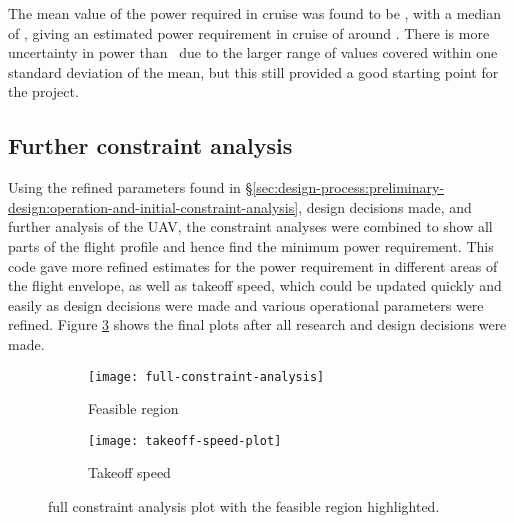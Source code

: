 \documentclass[../../main.tex]{subfiles}
\begin{document}
The mean value of the power required in cruise was found to be , with a median of , giving an estimated power requirement in cruise of around .
There is more uncertainty in power than \vcruise\, due to the larger range of values covered within one standard deviation of the mean, but this still provided a good starting point for the project.

\subsection{Further constraint analysis} \label{sec:design-process:preliminary-design:further-constraint-analysis}

Using the refined parameters found in \S \ref{sec:design-process:preliminary-design:operation-and-initial-constraint-analysis}, design decisions made, and further analysis of the UAV, the constraint analyses were combined to show all parts of the flight profile and hence find the minimum power requirement.
This code gave more refined estimates for the power requirement in different areas of the flight envelope, as well as takeoff speed, which could be updated quickly and easily as design decisions were made and various operational parameters were refined.
Figure \ref{fig:constraint-analysis} shows the final plots after all research and design decisions were made.


\begin{figure}[H]
    \centering
    \begin{subfigure}[b]{0.85\columnwidth}
        \centering
        \texttt{[image: full-constraint-analysis]}
        \caption{Feasible region}
        \label{fig:constraint-analysis:full}
    \end{subfigure}
    \hfill
    \begin{subfigure}[b]{0.85\columnwidth}
        \centering
        \texttt{[image: takeoff-speed-plot]}
        \caption{Takeoff speed}
        \label{fig:constraint-analysis:takeoff-speed}
    \end{subfigure}

    \caption{full constraint analysis plot with the feasible region highlighted.}
    \label{fig:constraint-analysis}
\end{figure}
\end{document}
